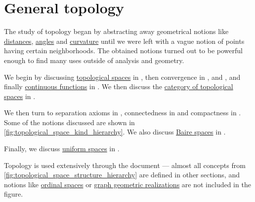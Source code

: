 \section{General topology}\label{sec:general_topology}

The study of topology began by abstracting away geometrical notions like \hyperref[def:metric_space]{distances}, \hyperref[def:angle]{angles} and \hyperref[def:regular_curve_curvature]{curvature} until we were left with a vague notion of points having certain neighborhoods. The obtained notions turned out to be powerful enough to find many uses outside of analysis and geometry.

We begin by discussing \hyperref[def:topological_space]{topological spaces} in , then convergence in ,  and , and finally \hyperref[def:global_continuity]{continuous functions} in . We then discuss the \hyperref[def:category_of_small_topological_spaces]{category of topological spaces} in .

We then turn to separation axioms in , connectedness in  and compactness in . Some of the notions discussed are shown in \cref{fig:topological_space_kind_hierarchy}. We also discuss \hyperref[def:baire_space]{Baire spaces} in .

Finally, we discuss \hyperref[def:uniform_space]{uniform spaces} in .

Topology is used extensively through the document --- almost all concepts from \cref{fig:topological_space_structure_hierarchy} are defined in other sections, and notions like \hyperref[def:ordinal_space]{ordinal spaces} or \hyperref[def:graph_geometric_realization]{graph geometric realizations} are not included in the figure.

